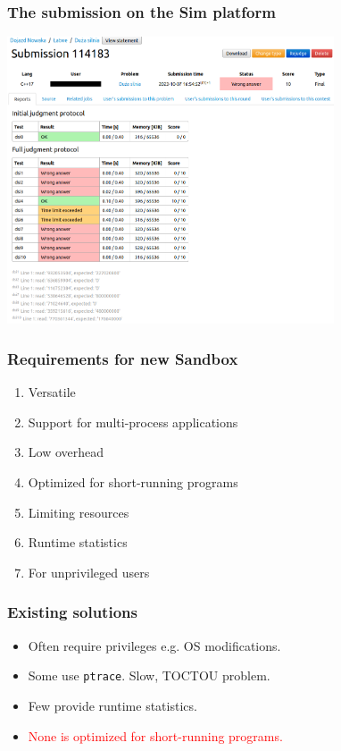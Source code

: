 \documentclass{beamer}
\begin{document}
\begin{frame}
    \frametitle{The submission on the Sim platform}
    \includegraphics[height=8.5cm]{submission.png}
\end{frame}

\begin{frame}
    \frametitle{Requirements for new Sandbox}
    \begin{enumerate}
        \item Versatile
        \item Support for multi-process applications
        \item Low overhead
        \item Optimized for short-running programs
        \item Limiting resources
        \item Runtime statistics
        \item For unprivileged users
    \end{enumerate}
\end{frame}

\begin{frame}
    \frametitle{Existing solutions}
    \begin{itemize}
        \item Often require privileges e.g. OS modifications.
        \item Some use \texttt{ptrace}. Slow, TOCTOU problem.
        \item Few provide runtime statistics.
        \item \textcolor{red}{None is optimized for short-running programs.}
    \end{itemize}
\end{frame}
\end{document}
